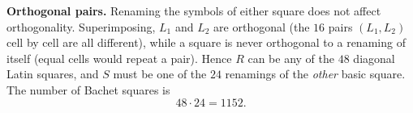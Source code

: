 \textbf{Orthogonal pairs.} Renaming the symbols of either square does not affect orthogonality. Superimposing, $L_1$ and $L_2$ are orthogonal (the $16$ pairs $(L_1,L_2)$ cell by cell are all different), while a square is never orthogonal to a renaming of itself (equal cells would repeat a pair). Hence $R$ can be any of the $48$ diagonal Latin squares, and $S$ must be one of the $24$ renamings of the \emph{other} basic square. The number of Bachet squares is
\[
48\cdot24=\boxed{1152}.
\]
